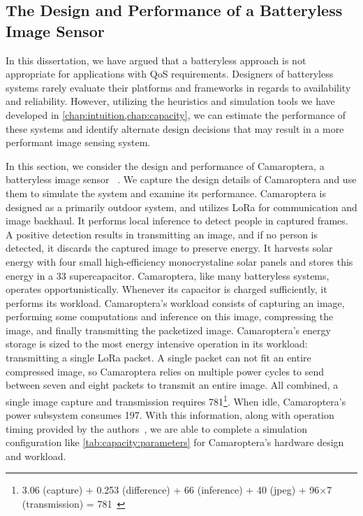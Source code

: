\subsection{The Design and Performance of a Batteryless Image Sensor}
In this dissertation, we have argued that a batteryless approach is not appropriate for applications with QoS requirements. Designers of batteryless systems rarely evaluate their platforms and frameworks in regards to availability and reliability. However, utilizing the heuristics and simulation tools we have developed in \cref{chap:intuition,chap:capacity}, we can estimate the performance of these systems and identify alternate design decisions that may result in a more performant image sensing system.

In this section, we consider the design and performance of Camaroptera, a batteryless image sensor
~\cite{nardello2019camaroptera,desai2022camaroptera}.
We capture the design details of Camaroptera and use them to simulate the system and examine its performance.
Camaroptera is designed as a primarily outdoor system, and utilizes LoRa for communication and image backhaul.
It performs local inference to detect people in captured frames. A positive detection results in transmitting an image, and if no person is detected, it discards the captured image to preserve energy. 
It harvests solar energy with four small high-efficiency monocrystaline solar panels and stores this energy in a 33\ssi{\milli\farad} supercapacitor.
Camaroptera, like many batteryless systems, operates opportunistically. 
Whenever its capacitor is charged sufficiently, it performs its workload. 
Camaroptera's workload consists of capturing an image, performing some computations and inference on this image, compressing the image, and finally transmitting the packetized image. 
Camaroptera's energy storage is sized to the most energy intensive operation in its workload: transmitting a single LoRa packet.
A single packet can not fit an entire compressed image, so Camaroptera relies on multiple power cycles to send between seven and eight packets to transmit an entire image.
All combined, a single image capture and transmission requires 781\ssi{\joule}\footnote{3.06 (capture) + 0.253 (difference) + 66 (inference) + 40 (jpeg) + 96$\times$7 (transmission) = 781\ssi{\milli\joule}~\cite{desai2022camaroptera}}.
When idle, Camaroptera's power subsystem consumes 197\ssi{\micro\watt}.
With this information, along with operation timing provided by the authors~\cite{desai2022camaroptera}, we are able to complete a simulation configuration like \cref{tab:capacity:parameters} for Camaroptera's hardware design and workload.

